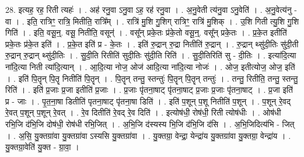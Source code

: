 \documentclass[17pt]{extarticle}
\begin{document}
28. इत्यह॒ रह॒ रिती त्यहः॑ । . अह॑ रनु॒वा ऽनु॒वा ऽह॒ रह॑ रनु॒वा । . अ॒नु॒वेती त्य॑नु॒वा ऽनु॒वेति॑ । . अ॒नु॒वेत्य॑नु - वा । . इति॒ रात्रिꣳ॒॒ रात्रि॒ मितीति॒ रात्रि᳚म् । . रात्रि॑ मु॒शि गु॒शिग् रात्रिꣳ॒॒ रात्रि॑ मु॒शिक् । . उ॒शि गिती त्यु॒शि गु॒शि गिति॑ । . इति॒ वसू॒न्॒. वसू॒ नितीति॒ वसून्॑ । . वसू᳚न् प्रके॒तः प्र॑के॒तो वसू॒न्॒. वसू᳚न् प्रके॒तः । . प्र॒के॒त इतीति॑ प्रके॒तः प्र॑के॒त इति॑ । . प्र॒के॒त इति॑ प्र - के॒तः । . इति॑ रु॒द्रान् रु॒द्रा नितीति॑ रु॒द्रान् । . रु॒द्रान् थ्सु॑दी॒तिः सु॑दी॒ती रु॒द्रान् रु॒द्रान् थ्सु॑दी॒तिः । . सु॒दी॒ति रितीति॑ सुदी॒तिः सु॑दी॒ति रिति॑ । . सु॒दी॒तिरिति॑ सु - दी॒तिः । . इत्या॑दि॒त्या ना॑दि॒त्या निती त्या॑दि॒त्यान् । . आ॒दि॒त्या नोज॒ ओज॑ आदि॒त्या ना॑दि॒त्या नोजः॑ । . ओज॒ इतीत्योज॒ ओज॒ इति॑ । . इति॑ पि॒तॄन् पि॒तॄ नितीति॑ पि॒तॄन् । . पि॒तॄन् तन्तु॒ स्तन्तुः॑ पि॒तॄन् पि॒तॄन् तन्तुः॑ । . तन्तु॒ रितीति॒ तन्तु॒ स्तन्तु॒ रिति॑ । . इति॑ प्र॒जाः प्र॒जा इतीति॑ प्र॒जाः । . प्र॒जाः पृ॑तना॒षाट् पृ॑तना॒षाट् प्र॒जाः प्र॒जाः पृ॑तना॒षाट् । . प्र॒जा इति॑ प्र - जाः । . पृ॒त॒ना॒षा डितीति॑ पृतना॒षाट् पृ॑तना॒षा डिति॑ । . इति॑ प॒शून् प॒शू नितीति॑ प॒शून् । . प॒शून् रे॒वद् रे॒वत् प॒शून् प॒शून् रे॒वत् । . रे॒व दितीति॑ रे॒वद् रे॒व दिति॑ । . इत्योष॑धी॒ रोष॑धी॒ रिती त्योष॑धीः । . ओष॑धी रभि॒जि द॑भि॒जि दोष॑धी॒ रोष॑धी रभि॒जित् । . अ॒भि॒जि द॑स्यस्य भि॒जि द॑भि॒जि द॑सि । . अ॒भि॒जिदित्य॑भि - जित् । . अ॒सि॒ यु॒क्तग्रा॑वा यु॒क्तग्रा॑वा ऽस्यसि यु॒क्तग्रा॑वा । . यु॒क्तग्रा॒ वेन्द्रा॒ येन्द्रा॑य यु॒क्तग्रा॑वा यु॒क्तग्रा॒ वेन्द्रा॑य । . यु॒क्तग्रा॒वेति॑ यु॒क्त - ग्रा॒वा॒ । \newline
\end{document}
